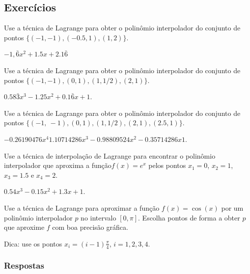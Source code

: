 \subsection{Exercícios}

\begin{exer}
  Use a técnica de Lagrange para obter o polinômio interpolador do conjunto de pontos $\{(-1, -1), (-0.5, 1), (1, 2)\}$.
\end{exer}
\begin{resp}
  $-1,\bar{6}x^2 + 1.5x + 2.1\bar{6}$
\end{resp}

\begin{exer}
  Use a técnica de Lagrange para obter o polinômio interpolador do conjunto de pontos $\{(-1, -1), (0, 1), (1, 1/2), (2, 1)\}$.
\end{exer}
\begin{resp}
  $0.58\bar{3}x^3 - 1.25x^2 + 0.1\bar{6}x + 1$. 
\end{resp}

\begin{exer}
  Use a técnica de Lagrange para obter o polinômio interpolador do conjunto de pontos $\{(-1,~-1), (0, 1), (1, 1/2), (2, 1), (2.5, 1)\}$.
\end{exer}
\begin{resp}
  $-0.26190476x^4  1.10714286x^3 -0.98809524x^2 -0.35714286x  1$.  
\end{resp}

\begin{exer}
  Use a técnica de interpolação de Lagrange para encontrar o polinômio interpolador que aproxima a função$f(x)=e^{x}$ pelos pontos $x_1=0$, $x_2=1$, $x_3=1.5$ e $x_4=2$.
\end{exer}
\begin{resp}
$0.54x^3 - 0.15x^2 + 1.3x + 1$.
\end{resp}

\begin{exer}
  Use a técnica de Lagrange para aproximar a função $f(x) = \cos(x)$ por um polinômio interpolador $p$ no intervalo $[0, \pi]$. Escolha pontos de forma a obter $p$ que aproxime $f$ com boa precisão gráfica.
\end{exer}
\begin{resp}
  Dica: use os pontos $x_i = (i-1)\frac{\pi}{4}$, $i = 1, 2, 3, 4$.
\end{resp}

\ifisbook
\subsubsection{Respostas}
\shipoutAnswer
\fi

